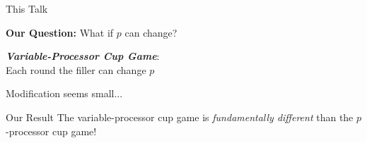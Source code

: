 \documentclass[xcolor=x11names, svgnames, rgb]{beamer}
\newcommand{\defn}[1]       {{\textit{\textbf{\boldmath #1}}}}
\begin{document}
\begin{frame}[t]{This Talk}

  \textbf{Our Question:} What if $p$ can change?
\vspace{1cm}

  \defn{Variable-Processor Cup Game}: \\
  Each round the filler can change $p$ 

\vspace{1cm}
Modification seems small...
\end{frame}

\begin{frame}[c]{Our Result}
  The variable-processor cup game is \emph{fundamentally different} than the $p$-processor cup game!
\end{frame}
\end{document}
